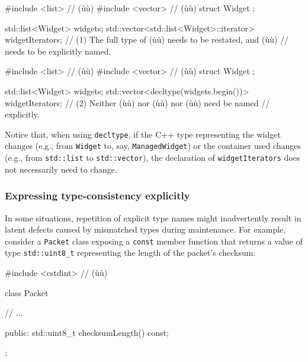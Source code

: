 \begin{emcppshiddenlisting}[emcppsbatch=e4]
#include <list>    // (ù{}ù)   
#include <vector>  // (ù{}ù)
struct Widget {};
\end{emcppshiddenlisting}
\begin{emcppslisting}[emcppsbatch=e4]
std::list<Widget> widgets;
std::vector<std::list<Widget>::iterator> widgetIterators;
    // (1) The full type of (ù{}ù) needs to be restated, and (ù{}ù)
    // needs to be explicitly named.
\end{emcppslisting}
\begin{emcppshiddenlisting}[emcppsbatch=e4-1]
#include <list>    // (ù{}ù)   
#include <vector>  // (ù{}ù)
struct Widget {};
\end{emcppshiddenlisting}
\begin{emcppslisting}[emcppsbatch=e4-1]
std::list<Widget> widgets;
std::vector<decltype(widgets.begin())> widgetIterators;
    // (2) Neither (ù{}ù) nor (ù{}ù) nor (ù{}ù) need be named
    // explicitly.
\end{emcppslisting}

\noindent Notice that, when using \lstinline!decltype!, if the C++ type representing
the widget changes (e.g., from \lstinline!Widget! to, say,
\lstinline!ManagedWidget!) or the container used changes (e.g., from
\lstinline!std::list! to \lstinline!std::vector!), the declaration of
\lstinline!widgetIterators! does not necessarily need to change.

\subsubsection[Expressing type-consistency explicitly]{Expressing type-consistency explicitly}\label{expressing-type-consistency-explicitly}

In some situations, repetition of explicit type names might
inadvertently result in latent defects caused by mismatched types during
maintenance. For example, consider a \lstinline!Packet! class exposing a
\lstinline!const! member function that returns a value of type \lstinline!std::uint8_t!
representing the length of the packet's checksum:

\begin{emcppshiddenlisting}[emcppsbatch=e6]
#include <cstdint>  // (ù{}ù)
\end{emcppshiddenlisting}
\begin{emcppslisting}[emcppsbatch=e6]
class Packet
{
    // ...
    
public:
    std::uint8_t checksumLength() const;
};
\end{emcppslisting}

